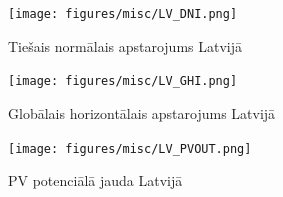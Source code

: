 \begin{figure}[h]
    \centering
    \texttt{[image: figures/misc/LV\_DNI.png]}
    \caption{Tiešais normālais apstarojums Latvijā \cite{solargis}}
    \label{fig:lv_DNI}
\end{figure}
\begin{figure}[h]
    \centering
    \texttt{[image: figures/misc/LV\_GHI.png]}
    \caption{Globālais horizontālais apstarojums Latvijā \cite{solargis}}
    \label{fig:lv_GHI}
\end{figure}
\begin{figure}[h]
    \centering
    \texttt{[image: figures/misc/LV\_PVOUT.png]}
    \caption{PV potenciālā jauda Latvijā \cite{solargis}}
    \label{fig:lv_PVOUT}
\end{figure}